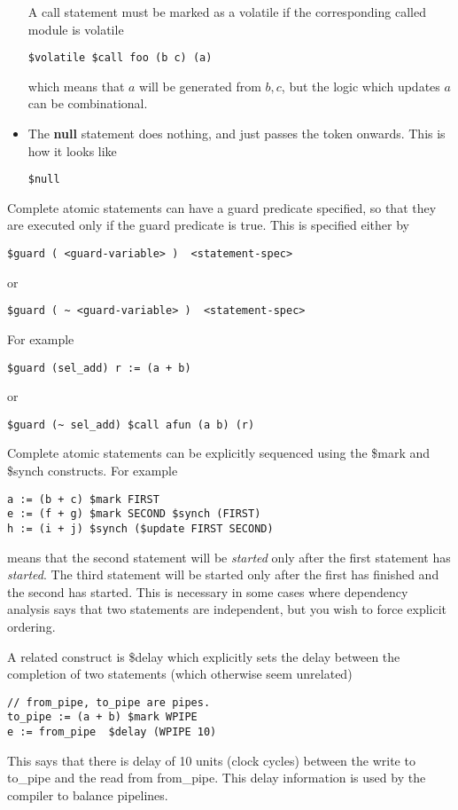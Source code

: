 \documentclass{article}
\begin{document}
\begin{itemize}
A call statement must be marked as a volatile
if the corresponding called module is volatile
\begin{verbatim}
$volatile $call foo (b c) (a)
\end{verbatim}
which means that $a$ will be generated from $b,c$, but
the logic which updates $a$ can be combinational.

\item The {\bf null} statement does nothing, and just passes the
token onwards.  This is how it looks like
\begin{verbatim}
$null
\end{verbatim}
\end{itemize}

Complete atomic statements can have a guard predicate
specified, so that they are executed only if the guard
predicate is true.  This is specified either by
\begin{verbatim}
$guard ( <guard-variable> )  <statement-spec>
\end{verbatim}
or 
\begin{verbatim}
$guard ( ~ <guard-variable> )  <statement-spec>
\end{verbatim}
For example
\begin{verbatim}
$guard (sel_add) r := (a + b)
\end{verbatim}
or
\begin{verbatim}
$guard (~ sel_add) $call afun (a b) (r)
\end{verbatim}

Complete atomic statements can be explicitly sequenced using
the \$mark and \$synch constructs.  For example
\begin{verbatim}
a := (b + c) $mark FIRST
e := (f + g) $mark SECOND $synch (FIRST)
h := (i + j) $synch ($update FIRST SECOND)
\end{verbatim}
means that the second statement will be {\em started}
only after the first statement has {\em started}.  The
third statement will be started only after the first
has finished and the second has started. This
is necessary in some cases where dependency analysis
says that two statements are independent, but you wish
to force explicit ordering.

A related construct is \$delay which explicitly sets
the delay between the completion of two statements
(which otherwise seem unrelated)
\begin{verbatim}
// from_pipe, to_pipe are pipes.
to_pipe := (a + b) $mark WPIPE
e := from_pipe  $delay (WPIPE 10)
\end{verbatim}
This says that there is delay of 10 units (clock cycles)
between the write to to\_pipe and the read from from\_pipe.
This delay information is used by the compiler to 
balance pipelines.
\end{document}
